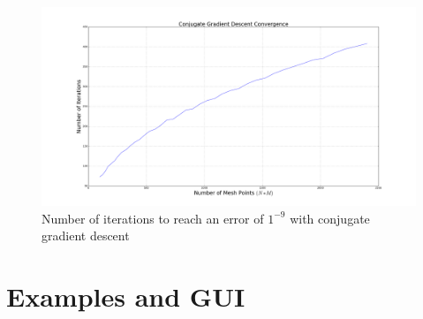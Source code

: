 \documentclass[a4paper]{report}
\begin{document}
\begin{figure}[H]
\begin{center}
\includegraphics[scale=0.20]{CGD_iter.png}\caption{Number of iterations to reach an error of $1^{-9}$ with conjugate gradient descent}
\end{center}
\end{figure}


\chapter{Examples and GUI}
\end{document}
